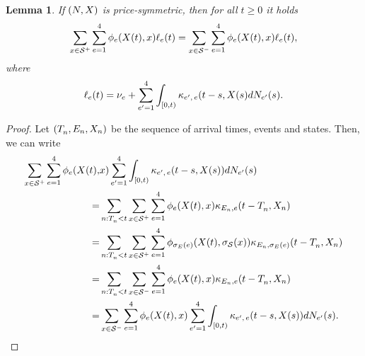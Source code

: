 \documentclass[10pt]{article}
\newtheorem{lemma}[thm]{Lemma}
\begin{document}
\begin{lemma}\label{lemma.price-simmetry}
 If $\sdHawkesPair$ is price-symmetric, then for all $t\geq 0$ it holds
 \begin{equation*}
  \sum_{x\in\inflationarySpace}\sum_{e=1}^{4}
  \transProb_{e}(\stateVariable(t),x)\ell_{e}(t)
  =
  \sum_{x\in\deflationarySpace}\sum_{e=1}^{4}
  \transProb_{e}(\stateVariable(t),x)\ell_{e}(t),
 \end{equation*}
where
\begin{equation*}
 \ell_{e}(t) = \baseRate_{e}
 +
 \sum_{\eone=1}^{4}\int_{[0,t)} \hawkesKernel\subscriptee(t-s,\stateVariable(s)d\countingProc[\eone](s).
\end{equation*}
\end{lemma}
\begin{proof}
 Let $(\arrivalTimes[]_n,\event[n], \stateVariable_n)$ be the sequence of arrival times, events and states. Then, we can write
 \begin{equation*}
  \begin{split}
   \sum_{x\in\inflationarySpace}\sum_{e=1}^{4}
   \transProb_{e}(\stateVariable(t),& x)
   \sum_{\eone=1}^{4}\int_{[0,t)}\hawkesKernel\subscriptee(t-s,\stateVariable(s))d\countingProc[\eone](s)
   \\
   =&
   \sum_{n:\arrivalTimes[]_n <t}
   \sum_{x\in\inflationarySpace}\sum_{e=1}^{4}
   \transProb_{e}(\stateVariable(t),x)
   \hawkesKernel_{\event[n],e}(t-\arrivalTimes[]_n,\stateVariable_n)
   \\
   =&
   \sum_{n:\arrivalTimes[]_n <t}
   \sum_{x\in\inflationarySpace}\sum_{e=1}^{4}
   \transProb_{\sigma_{E}(e)}(\stateVariable(t),\sigma_{\stateSpace}(x))
   \hawkesKernel_{\event[n],\sigma_{E}(e)}(t-\arrivalTimes[]_n,\stateVariable_n)
   \\
   =&
   \sum_{n:\arrivalTimes[]_n <t}
   \sum_{x\in\deflationarySpace}\sum_{e=1}^{4}
   \transProb_{e}(\stateVariable(t),x)
   \hawkesKernel_{\event[n],e}(t-\arrivalTimes[]_n,\stateVariable_n)
   \\   
   =&
   \sum_{x\in\deflationarySpace}\sum_{e=1}^{4}
   \transProb_{e}(\stateVariable(t), x)
   \sum_{\eone=1}^{4}\int_{[0,t)}\hawkesKernel\subscriptee(t-s,\stateVariable(s))d\countingProc[\eone](s).
   \end{split}
 \end{equation*}
\end{proof}
\end{document}

